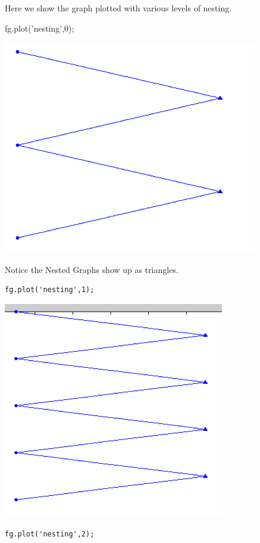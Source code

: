 Here we show the graph plotted with various levels of nesting.

fg.plot('nesting',0);

\includegraphics{images/plot10.png}


Notice the Nested Graphs show up as triangles.

\begin{lstlisting}
fg.plot('nesting',1);
\end{lstlisting}

\includegraphics{images/plot11.png}
 
\begin{lstlisting}
fg.plot('nesting',2);
\end{lstlisting}


